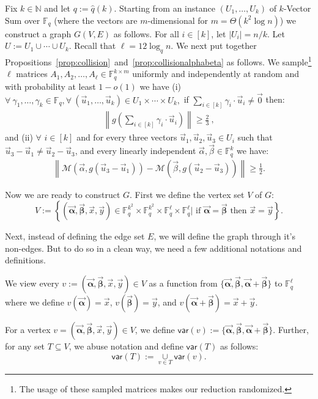 \documentclass[11pt]{article}
\newcommand{\F}{\mathbb{F}}
\renewcommand{\ge}{ \geqslant}
\newcommand{\alphab}{\vec{\bm{\alpha}}}
\newcommand{\betab}{\vec{\bm{\beta}}}
\newcommand{\var}{\mathsf{var}}
\newcommand{\M}{\mathcal{M}}
\begin{document}
Fix $k\in\mathbb{N}$ and let $q:=\hat{q}(k)$.
Starting from an instance $(U_1,\ldots ,U_k)$ of $k$-Vector Sum over $\F_q$ (where the vectors are $m$-dimensional for $m=\Theta(k^2\log n)$) we  construct a graph $G(V,E)$ as follows. For all $i\in[k]$, let $|U_i|=n/k$. Let $U:=U_1\cup\cdots\cup U_k$.  Recall that $\ell=12\log_q n$. We next put together  Propositions~\ref{prop:collision}~and~\ref{prop:collisionalphabeta} as follows. We sample\footnote{The usage of these sampled matrices makes our reduction randomized.} $\ell$ matrices $A_1,A_2,\ldots,A_\ell\in \mathbb{F}_q^{k\times m}$ uniformly and independently at random and  with probability at least $1-o(1)$ we have (i) $\forall\ \gamma_1,\ldots ,\gamma_k\in \F_q, \forall\ (\vec{u}_1,\ldots ,\vec{u}_k)\in U_1\times \cdots \times U_k,$ if $\underset{i\in[k]}{\sum}\gamma_i\cdot \vec{u}_i\neq \vec{0}$ then:
\begin{align}
\left\|g\left(\sum_{i\in[k]}\gamma_i\cdot \vec{u}_i\right)\right\|\ge \frac{2}{3}\ ,\label{prop1}
\end{align} 
and (ii) $\forall$ $i\in [k]$ and for every three vectors $\vec{u}_1,\vec{u}_2,\vec{u}_3\in U_i$ such that $\vec{u}_3-\vec{u}_1\neq \vec{u}_2-\vec{u}_3$, and every linearly independent $\vec{\alpha},\vec{\beta}\in \F_q^k$ we have: 
\begin{align}
\left\|\M\left(\vec{\alpha},g(\vec{u}_3-\vec{u}_1)\right)- \M\left(\vec{\beta},g(\vec{u}_2-\vec{u}_3)\right)\right\|\ge \frac{1}{2}.\label{prop2}
\end{align} 

Now we are ready to construct $G$. First we define the vertex set $V$ of $G$:
$$
V:=\left\{(\alphab,\betab,\vec{x},\vec{y})\in \F_q^{k^2}\times\F_q^{k^2}\times \F_q^{\ell}\times \F_q^{\ell}\big| \text{ if }\alphab= \betab\text{ then }\vec{x}=\vec{y}\right\}.
$$

 Next, instead of defining the edge set $E$, we will define the graph through it's non-edges. But to do so in a clean way, we need a few additional notations and definitions.
 
 
We view every $v:=(\alphab,\betab,\vec{x},\vec{y})\in V$ as a function from $\{\alphab,\betab,\alphab+\betab\}$ to $\F_q^\ell$ where we define $v(\alphab)=\vec{x}$, $v(\betab)=\vec{y}$, and $v(\alphab+\betab)=\vec{x}+\vec{y}$. 


For a vertex $v=(\alphab,\betab,\vec{x},\vec{y})\in V$, we define $\var(v):=\{\alphab,\betab,\alphab+\betab\}$. Further, for any set $T\subseteq V$, we abuse notation and  define $\var(T)$ as follows:
$$
\var(T):=\underset{v\in T}{\cup}\var(v).
$$
\end{document}
